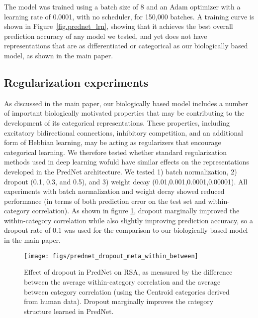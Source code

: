 \documentclass[12pt,twoside]{naturefigs}
\newif\myifpdf
\begin{document}
The model was trained using a batch size of 8 and an Adam optimizer with a learning rate of 0.0001, with no scheduler, for 150,000 batches.  A training curve is shown in Figure~\ref{fig.prednet_lrn}, showing that it achieves the best overall prediction accuracy of any model we tested, and yet does not have representations that are as differentiated or categorical as our biologically based model, as shown in the main paper.

\subsection{Regularization experiments}

As discussed in the main paper, our biologically based model includes a number of important biologically motivated properties that may be contributing to the development of its categorical representations. These properties, including excitatory bidirectional connections, inhibitory competition, and an additional form of Hebbian learning, may be acting as regularizers that encourage categorical learning. We therefore tested whether standard regularization methods used in deep learning wofuld have similar effects on the representations developed in the PredNet architecture. We tested 1) batch normalization, 2) dropout (0.1, 0.3, and 0.5), and 3) weight decay (0.01,0.001,0.0001,0.00001). All experiments with batch normalization and weight decay showed reduced performance (in terms of both prediction error on the test set and within-category correlation). As shown in figure \ref{fig.prednet_dropout_within_between}, dropout marginally improved the within-category correlation while also slightly improving prediction accuracy, so a dropout rate of 0.1 was used for the comparison to our biologically based model in the main paper. 

\begin{figure}
  \centering\texttt{[image: figs/prednet\_dropout\_meta\_within\_between]}
  \caption{Effect of dropout in PredNet on RSA, as measured by the difference between the average within-category correlation and the average between category correlation (using the Centroid categories derived from human data). Dropout marginally improves the category structure learned in PredNet.}
  \label{fig.prednet_dropout_within_between}
\end{figure}


\end{document}
